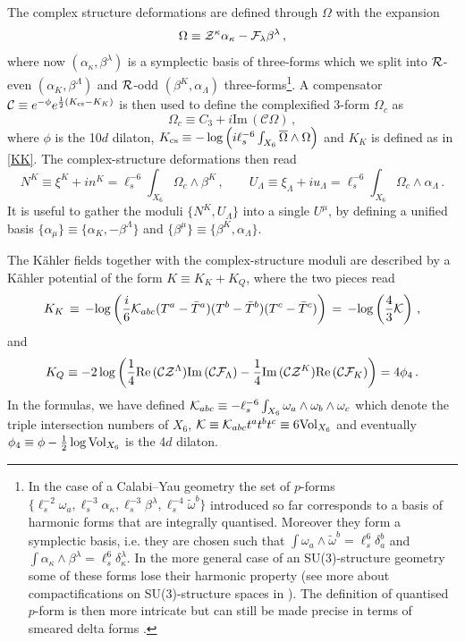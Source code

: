 \documentclass[11pt, a4paper]{article}
\def\ov{\overline}
\def\im{\mbox{Im}\, }
\def\IM{\text{Im}\,}
\def\RE{\text{Re}\,}
\def\CK {{\cal K}}
\newcommand{\cK}{\mathcal{K}}
\def\oh{\frac{1}{2}}
\def\be{\begin{equation}}
\def\ee{\end{equation}}
\begin{document}
The complex structure deformations are defined through $\Omega$ with the expansion
\be
\Omega \equiv {\cal Z}^\kappa \alpha_\kappa - {\cal F}_\lambda \beta^\lambda\, ,
\ee
%
where now $(\alpha_\kappa, \beta^\lambda)$ is a symplectic basis of three-forms which we split into ${\cal R}$-even $(\alpha_K, \beta^\Lambda)$ and ${\cal R}$-odd  $(\beta^K, \alpha_\Lambda)$ three-forms\footnote{In the case of a Calabi--Yau geometry the set of $p$-forms $\{ \ell_s^{-2} \omega_a,  \ell_s^{-3} \alpha_\kappa,  \ell_s^{-3} \beta^\lambda, \ell_s^{-4} \tilde{\omega}^b\}$ introduced so far corresponds to a basis of harmonic forms that are integrally quantised. Moreover they form a symplectic basis, i.e. they are chosen such that $\int \omega_a \wedge \tilde{\omega}^b=\ell_s^6\delta_a^b$ and  $\int \alpha_\kappa \wedge \beta^\lambda=\ell_s^6 \delta_\kappa^\lambda$. In the more general case of an SU(3)-structure geometry some of these forms lose their harmonic property (see more about compactifications on SU(3)-structure spaces in \cite{Grana:2005ny,Kashani-Poor:2006ofe}). The definition of quantised $p$-form is then more intricate but can still be made precise in terms of smeared delta forms \cite{Casas:2023wlo}.}. A compensator $\mathcal{C}\equiv e^{-\phi}e^{\frac{1}{2}(K_{\rm cs}-K_K)}$ \cite{Grimm:2004ua} is then used to define the complexified 3-form $\Omega_c$ as
\begin{equation}
    \Omega_c\equiv C_3+i \im (\mathcal{C}\Omega)\, ,
\end{equation}
 where $\phi$ is the 10$d$ dilaton, $K_{\rm cs} \equiv - \log \left(i\ell_s^{-6} \int_{X_6} \ov \Omega \wedge   \Omega \right)$ and $K_K$ is defined as in \eqref{KK}. The complex-structure deformations then read
\begin{equation}\label{cpxmoduli}
N^K \equiv \xi^K + i n^K = \ell_s^{-6} \int_{X_6} \Omega_c \wedge \beta^K\, , \qquad  U_{\Lambda} \equiv \xi_\Lambda + i u_\Lambda =  \ell_s^{-6} \int_{X_6} \Omega_c \wedge \alpha_\Lambda\, .
\end{equation}
%
It is useful to gather the moduli $\{N^K, U_\Lambda\}$ into a single $U^\mu$, by defining a unified basis $\{\alpha_\mu\}\equiv \{\alpha_K,-\beta^\Lambda\}$ and $\{\beta^\mu\}\equiv \{\beta^K,\alpha_\Lambda\}$. 

The Kähler fields together with the complex-structure moduli are described by a K\"ahler potential of the form $K \equiv K_K + K_Q$, where the two pieces read
\be
K_K \,  \equiv \, -{\rm log} \left(\frac{i}{6} \CK_{abc} (T^a - \bar{T}^a)(T^b - \bar{T}^b)(T^c - \bar{T}^c) \right) \, = \,  -{\rm log} \left(\frac{4}{3} \cK\right) \, ,
\label{KK}
\ee
and 
\begin{equation}\label{KQ}
 K_Q \equiv -2 \log \left( \frac{1}{4} \RE({\cal C}{\cal Z}^\Lambda) \IM({\cal C} {\cal F}_\Lambda) - \frac{1}{4} \IM({\cal C} {\cal Z}^K) \RE({\cal C} {\cal F}_K) \right) = 4\phi_4 \, .
\end{equation}
%
In the formulas, we have defined ${\cal K}_{abc} \equiv - \ell_s^{-6} \int_{X_6} \omega_a \wedge \omega_b \wedge \omega_c$ which denote the triple intersection numbers of $X_6$, $\cK \equiv \cK_{abc} t^at^bt^c \equiv 6 {\rm Vol}_{X_6}$ and eventually $\phi_4 \equiv \phi - \oh \log {\rm Vol}_{X_6}$ is the 4$d$ dilaton. 
\end{document}
